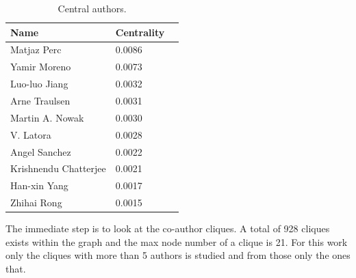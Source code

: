\documentclass{article}
\begin{document}
\begin{table}[!hbtp]
    \begin{center}
        \begin{tabular}{lll}
            \toprule
            Name & Centrality \\
            \midrule
            Matjaz Perc & 0.0086 \\
            Yamir Moreno & 0.0073 \\
            Luo-luo Jiang & 0.0032 \\
            Arne Traulsen & 0.0031 \\
            Martin A. Nowak & 0.0030 \\
            V. Latora & 0.0028 \\
            Angel Sanchez & 0.0022 \\
            Krishnendu Chatterjee & 0.0021 \\
            Han-xin Yang & 0.0017 \\
            Zhihai Rong & 0.0015 \\
            \bottomrule
        \end{tabular}
    \end{center}
    \caption{Central authors.}
    \label{table:central_authors}
\end{table}

The immediate step is to look at the co-author cliques. A total of 
928 cliques exists within the graph and the max node number of a clique is 21.
For this work only the cliques with more than 5 authors is studied and from
those only the ones that.
\end{document}
